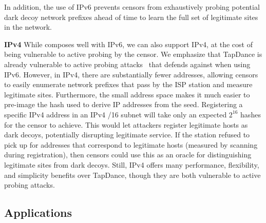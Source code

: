 \documentclass[letterpaper,twocolumn,10pt]{article}
\newcommand{\note}[2]{\hl{[\textbf{#1:} #2]}\xspace}
\newcommand{\nikita}[1]{\note{nikita}{#1}}
\renewcommand{\paragraph}[1]{\smallskip\noindent\textbf{#1\quad}}
\begin{document}
In addition, the use of IPv6 prevents censors from exhaustively probing
potential dark decoy network prefixes ahead of time to learn the full set of
legitimate sites in the network.

\paragraph{IPv4}
While \scheme composes well with IPv6, we can also support IPv4,
at the cost of being vulnerable to active probing by the censor.
We emphasize that TapDance is already
vulnerable to active probing attacks~\cite{tapdance14} that \scheme defends
against when using IPv6. However, in IPv4, there are substantially fewer
addresses, allowing censors to easily enumerate network prefixes that pass by
the ISP station and measure legitimate sites. Furthermore, the small address
space makes it much easier to pre-image the hash used to derive IP addresses
from the seed. Registering a specific IPv4 address in an IPv4 /16 subnet will
take only an expected $2^{16}$ hashes for the censor to achieve. This would let
attackers register legitimate hosts as dark decoys, potentially disrupting
legitimate service. If the station refused to pick up for addresses that
correspond to legitimate hosts (measured by scanning during registration), then
censors could use this as an oracle for distinguishing legitimate sites from
dark decoys. Still, IPv4 \scheme offers many performance, flexibility, and
simplicity benefits over TapDance, though they are both vulnerable to active
probing attacks.




\subsection{Applications}
\end{document}
